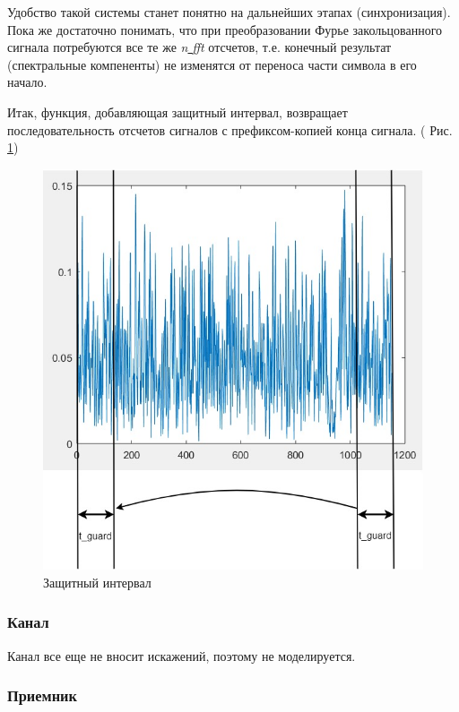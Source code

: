 Удобство такой системы станет понятно на дальнейших этапах (синхронизация). 
Пока же достаточно понимать, что при преобразовании Фурье  закольцованного сигнала  потребуются все те же \textit{n\underline{ }fft} отсчетов, т.е. конечный результат (спектральные компененты) не изменятся от переноса части символа в его начало. 

Итак, функция, добавляющая защитный интервал, возвращает последовательность отсчетов сигналов с префиксом-копией конца сигнала. ( Рис. \ref{fg:guard}) 


\begin{figure}[h!]
\centering
\includegraphics[width=1\textwidth]{guard}
\caption{Защитный интервал} \label{fg:guard}
\end{figure}

\subsubsection{Канал}

Канал все еще не вносит искажений, поэтому не моделируется.

\subsubsection{Приемник}

